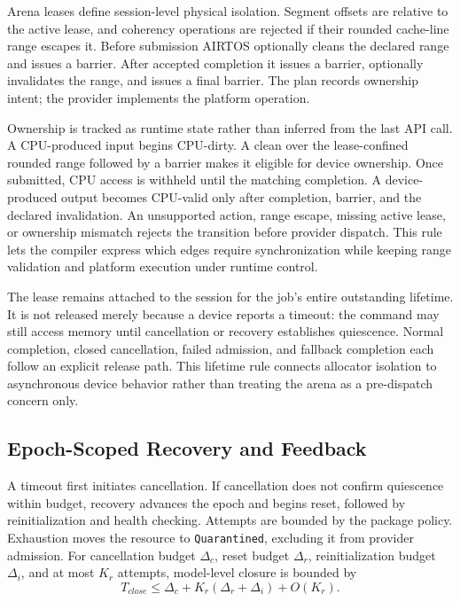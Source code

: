 \documentclass[lettersize,journal]{IEEEtran}
\begin{document}
Arena leases define session-level physical isolation. Segment offsets are
relative to the active lease, and coherency operations are rejected if their
rounded cache-line range escapes it. Before submission AIRTOS optionally cleans
the declared range and issues a barrier. After accepted completion it issues a
barrier, optionally invalidates the range, and issues a final barrier. The plan
records ownership intent; the provider implements the platform operation.

Ownership is tracked as runtime state rather than inferred from the last API
call. A CPU-produced input begins CPU-dirty. A clean over the lease-confined
rounded range followed by a barrier makes it eligible for device ownership.
Once submitted, CPU access is withheld until the matching completion. A
device-produced output becomes CPU-valid only after completion, barrier, and
the declared invalidation. An unsupported action, range escape, missing active
lease, or ownership mismatch rejects the transition before provider dispatch.
This rule lets the compiler express which edges require synchronization while
keeping range validation and platform execution under runtime control.

The lease remains attached to the session for the job's entire outstanding
lifetime. It is not released merely because a device reports a timeout: the
command may still access memory until cancellation or recovery establishes
quiescence. Normal completion, closed cancellation, failed admission, and
fallback completion each follow an explicit release path. This lifetime rule
connects allocator isolation to asynchronous device behavior rather than
treating the arena as a pre-dispatch concern only.

\subsection{Epoch-Scoped Recovery and Feedback}
A timeout first initiates cancellation. If cancellation does not confirm
quiescence within budget, recovery advances the epoch and begins reset,
followed by reinitialization and health checking. Attempts are bounded by the
package policy. Exhaustion moves the resource to \texttt{Quarantined}, excluding
it from provider admission. For cancellation budget $\Delta_c$, reset budget
$\Delta_r$, reinitialization budget $\Delta_i$, and at most $K_r$ attempts,
model-level closure is bounded by
\begin{equation}
T_{close}\le \Delta_c+K_r(\Delta_r+\Delta_i)+O(K_r).
\end{equation}
\end{document}
